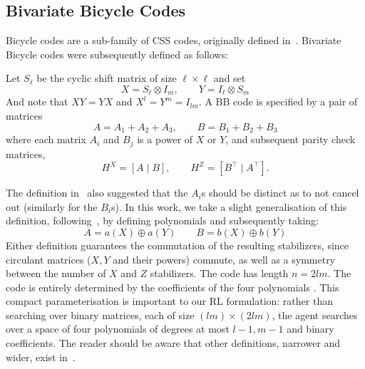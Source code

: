 \subsection{Bivariate Bicycle Codes}
\label{sec:bb}
Bicycle codes are a sub-family of CSS codes, originally defined in~\cite{mackay2004sparse}. Bivariate Bicycle codes were subsequently defined as follows:
\begin{definition}
    \label{def:bbcode}
Let \(S_\ell\) be the cyclic shift matrix of size 
\(\ell\times\ell\) and set 
\begin{equation}
X = S_\ell \otimes I_m,\qquad Y = I_\ell \otimes S_m
\end{equation}
And note that \(XY=YX\) and \(X^l=Y^m=I_{lm}\). A BB code is specified by a pair of matrices
\begin{equation}
    A = A_1 + A_2 +A_3, \qquad B=B_1+B_2+B_3
\end{equation}
where each matrix \(A_i\) and \(B_j\) is a power of \(X\) or \(Y\), and subsequent parity check matrices, 
\begin{equation}
    H^X = [A \mid B], \qquad H^Z = [B^\top \mid A^\top].
\end{equation}
\end{definition}
\noindent The definition in~\cite{bravyi2024high} also suggested that the \(A_i\)s should be distinct as to not cancel out (similarly for the \(B_i\)s). 
In this work, we take a slight generalisation of this definition, following~\cite{voss2024multivariate, voss2025multivariate}, by defining polynomials \polynomials{} and subsequently taking:
\begin{equation}
A=a(X) \oplus a(Y)  \qquad B = b(X) \oplus b(Y)     
\end{equation}
\noindent Either definition guarantees the commutation of the resulting stabilizers, since circulant matrices (\(X,Y\) and their powers) commute, as well as a symmetry between the number of \(X\) and \(Z\) stabilizers. The code has length \(n = 2l m\). The code is entirely determined by the coefficients of the four polynomials \polynomials{}. 
This compact parameterisation is important to our RL formulation: 
rather than searching over binary matrices, each of size \((lm) \times (2lm)\), 
the agent searches over a space of four polynomials of degrees at most \(l-1,m-1\) and binary coefficients. 
The reader should be aware that other definitions, narrower and wider, exist in~\cite{panteleev2021degenerate, wang2024coprime, eberhardt2024logical, kovalev2013quantum}.


